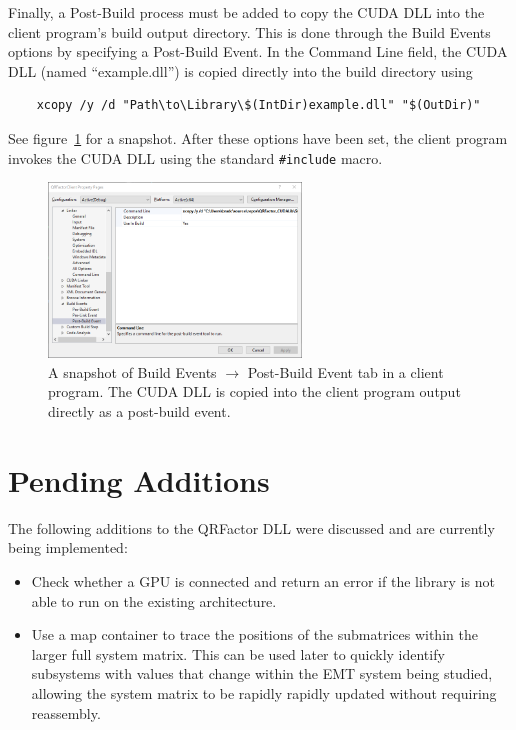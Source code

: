 \documentclass[11pt,letterpaper]{article}
\begin{document}
Finally, a Post-Build process must be added to copy the CUDA DLL into the client program's build output directory. This is done through the Build Events options by specifying a Post-Build Event. In the Command Line field, the CUDA DLL (named ``example.dll'') is copied directly into the build directory using
\begin{center}
\begin{verbatim}
    xcopy /y /d "Path\to\Library\$(IntDir)example.dll" "$(OutDir)"
\end{verbatim}
\end{center}
See figure~\ref{fig: post build} for a snapshot. After these options have been set, the client program invokes the CUDA DLL using the standard \verb+#include+ macro.

\begin{figure}
    \centering
    \includegraphics[width=0.6\textwidth]{DLL_ClientPostBuild.png}
    \caption{A snapshot of Build Events $\to$ Post-Build Event tab in a client program. The CUDA DLL is copied into the client program output directly as a post-build event.}
    \label{fig: post build}
\end{figure}

\section{Pending Additions}
\label{sec: additions}
The following additions to the QRFactor DLL were discussed and are currently being implemented:
\begin{itemize}
    \item Check whether a GPU is connected and return an error if the library is not able to run on the existing architecture.
    \item Use a map container to trace the positions of the submatrices within the larger full system matrix. This can be used later to quickly identify subsystems with values that change within the EMT system being studied, allowing the system matrix to be rapidly rapidly updated without requiring reassembly.
\end{itemize}
\end{document}
